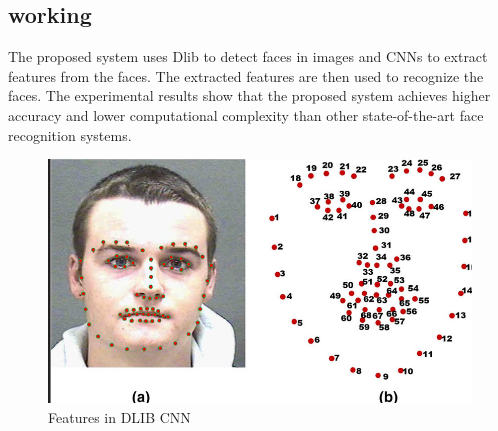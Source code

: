 \subsection*{working}
The proposed system uses Dlib to detect faces in images and CNNs to extract features from the faces. The extracted features are then used to recognize the faces. The experimental results show that the proposed system achieves higher accuracy and lower computational complexity than other state-of-the-art face recognition systems.
\begin{figure}[!htb]
    \centering
    \includegraphics[width=\linewidth]{Figures/Ch01/facerec.png}
    \caption{Features in DLIB CNN}
    \label{figure:DLIB}
    \end{figure}







